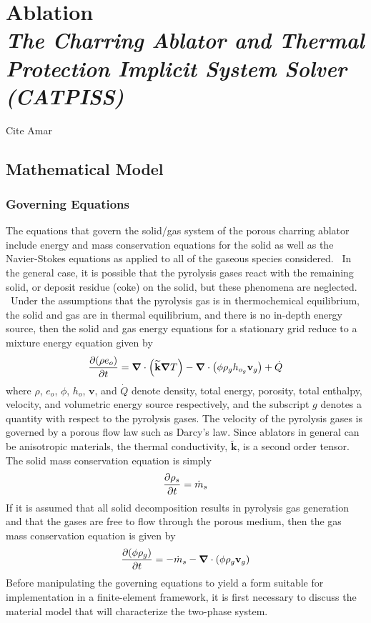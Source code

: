 \chapter[Ablation]{Ablation \\ \vspace{1em}  \huge{\textit{The Charring Ablator and Thermal Protection Implicit System Solver (CATPISS)}}}

Cite Amar~\cite{amar_thesis}

\section{Mathematical Model}
\subsection{Governing Equations}
The equations that govern the solid/gas system of the porous charring
ablator include energy and mass conservation equations for the solid as well 
as the Navier-Stokes equations as applied to all of the gaseous species considered.
\ In the general case, it is possible that the pyrolysis gases react with
the remaining solid, or deposit residue (coke) on the
solid, but these phenomena are neglected. \ Under the assumptions that the
pyrolysis gas is in thermochemical equilibrium, the solid and gas are in
thermal equilibrium, and there is no in-depth energy source, then the solid
and gas energy equations for a stationary grid reduce to a mixture energy
equation given by
\begin{equation}
  {\frac{\partial{\left(\rho e_{o} \right)}}{\partial{t}}} = {\boldsymbol{\nabla}} {}\cdot\left(\widetilde{\textbf{k}} {\boldsymbol{\nabla}} {T}\right) - {\boldsymbol{\nabla}} {}\cdot\left(\phi \rho_g h_{o_{g}} \textbf{v}_g \right) + \dot{Q}
  \label{eq:pde_abl_thermal}
\end{equation}
where $\rho$, $e_{o}$, $\phi$, $h_{o}$, $\textbf{v}$, and $\dot{Q}$ denote density, total energy, porosity, total enthalpy, velocity, and volumetric energy source respectively,
and the subscript $g$ denotes a quantity with respect to the pyrolysis gases.  The velocity of the pyrolysis gases is governed by a porous flow law such as Darcy's law. Since ablators in general can be anisotropic materials, the thermal conductivity, $\widetilde{\textbf{k}}$, is a second order tensor.
The solid mass conservation equation is simply
\begin{equation}
  {\frac{\partial{\rho_s}}{\partial{t}}} = \dot{m}_s
  \label{eq:pde_abl_solid_mass_conservation}
\end{equation}
If it is assumed that all solid decomposition results in pyrolysis gas generation and that the gases are free to flow through the porous medium,
then the gas mass conservation equation is given by
\begin{equation}
  {\frac{\partial{\left(\phi \rho_g\right)}}{\partial{t}}} = - \dot{m}_s - {\boldsymbol{\nabla}} {}\cdot\left(\phi \rho_g \textbf{v}_g \right)
  \label{eq:pde_abl_gass_mass_conservation}
\end{equation}
Before manipulating the governing equations to yield a form suitable for implementation in a finite-element framework, it is first necessary to discuss the material model that will characterize the two-phase system.
